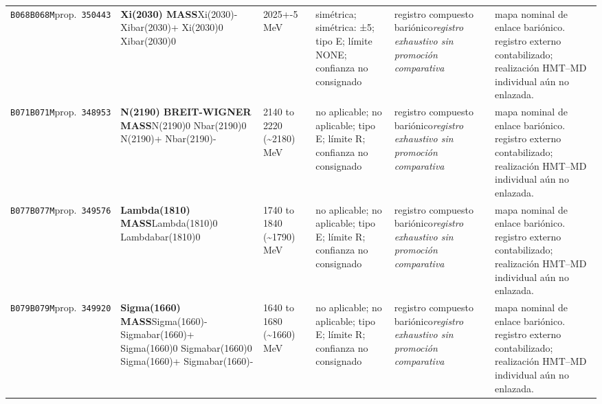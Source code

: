 \begin{landscape}
\begin{longtable}{L{1.85cm}L{4.45cm}L{2.35cm}L{4.05cm}L{3.35cm}L{7.15cm}}
\texttt{B068}\newline \texttt{B068M}\newline prop.\ \texttt{350443} & \textbf{Xi(2030) MASS}\newline Xi(2030)- \textbar{}\allowbreak{} Xibar(2030)+ \textbar{}\allowbreak{} Xi(2030)0 \textbar{}\allowbreak{} Xibar(2030)0 & 2025+-5\,MeV & simétrica; simétrica: ±5; tipo E; límite NONE; confianza no consignado & registro compuesto bariónico\newline \emph{registro exhaustivo sin promoción comparativa} & mapa nominal de enlace bariónico. registro externo contabilizado; realización HMT--MD individual aún no enlazada. \\
\texttt{B071}\newline \texttt{B071M}\newline prop.\ \texttt{348953} & \textbf{N(2190) BREIT-WIGNER MASS}\newline N(2190)0 \textbar{}\allowbreak{} Nbar(2190)0 \textbar{}\allowbreak{} N(2190)+ \textbar{}\allowbreak{} Nbar(2190)- & 2140 to 2220 (\textasciitilde{}2180)\,MeV & no aplicable; no aplicable; tipo E; límite R; confianza no consignado & registro compuesto bariónico\newline \emph{registro exhaustivo sin promoción comparativa} & mapa nominal de enlace bariónico. registro externo contabilizado; realización HMT--MD individual aún no enlazada. \\
\texttt{B077}\newline \texttt{B077M}\newline prop.\ \texttt{349576} & \textbf{Lambda(1810) MASS}\newline Lambda(1810)0 \textbar{}\allowbreak{} Lambdabar(1810)0 & 1740 to 1840 (\textasciitilde{}1790)\,MeV & no aplicable; no aplicable; tipo E; límite R; confianza no consignado & registro compuesto bariónico\newline \emph{registro exhaustivo sin promoción comparativa} & mapa nominal de enlace bariónico. registro externo contabilizado; realización HMT--MD individual aún no enlazada. \\
\texttt{B079}\newline \texttt{B079M}\newline prop.\ \texttt{349920} & \textbf{Sigma(1660) MASS}\newline Sigma(1660)- \textbar{}\allowbreak{} Sigmabar(1660)+ \textbar{}\allowbreak{} Sigma(1660)0 \textbar{}\allowbreak{} Sigmabar(1660)0 \textbar{}\allowbreak{} Sigma(1660)+ \textbar{}\allowbreak{} Sigmabar(1660)- & 1640 to 1680 (\textasciitilde{}1660)\,MeV & no aplicable; no aplicable; tipo E; límite R; confianza no consignado & registro compuesto bariónico\newline \emph{registro exhaustivo sin promoción comparativa} & mapa nominal de enlace bariónico. registro externo contabilizado; realización HMT--MD individual aún no enlazada. \\

\end{longtable}
\end{landscape}
